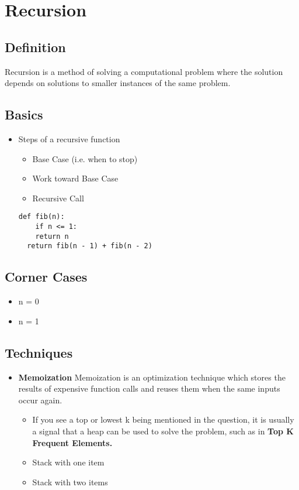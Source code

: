 \chapter{Recursion}
\section{Definition}
Recursion is a method of solving a computational problem where the solution depends on solutions to smaller instances of the same problem.
\section{Basics}
	\begin{itemize}
		\item Steps of a recursive function
			\begin{itemize}
			\item Base Case (i.e. when to stop)
			\item Work toward Base Case
			\item Recursive Call
			\end{itemize}
		\begin{lstlisting}
def fib(n):
	if n <= 1:
    return n
  return fib(n - 1) + fib(n - 2)
	\end{lstlisting}
	\end{itemize}
	
	\section{Corner Cases}
\begin{itemize}
	\item n = 0
	\item n = 1
\end{itemize}

		
		\section{Techniques}
		\begin{itemize}
			\item \textbf{Memoization}
			Memoization is an optimization technique which stores the results of expensive function calls and reuses them when the same inputs occur again.
		\begin{itemize}
			\item If you see a top or lowest k being mentioned in the question, it is usually a signal that a heap can be used to solve the problem, such as in \textbf{Top K Frequent Elements.}
			\item Stack with one item
			\item Stack with two items
		\end{itemize}
		\end{itemize}

